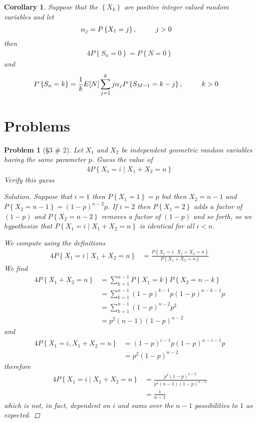 \documentclass[11pt, oneside]{book}   	%
\newtheorem{corollary}{Corollary}[chapter]
\newtheorem{problem}{Problem}[chapter]
\newcommand{\set}[1]{\left\{#1\right\}}
\begin{document}
\begin{corollary}
	Suppose that the $\set{X_k}$ are positive integer valued random variables and let 
	\begin{alignat}{4}
		\alpha_j=P\set{X_1=j},&\hspace{1 cm}j>0
	\end{alignat}
	then 
	\begin{alignat}{4}
		P\set{S_n=0}=P\set{N=0}
	\end{alignat}
	and 
	\begin{alignat}{4}
		P\set{S_n=k}=\frac{1}{k}E[N]\sum_{j=1}^k j\alpha_jP\set{S_{M-1}=k-j},&\hspace{1 cm}k>0
	\end{alignat}
\end{corollary}

\section{Problems}

\begin{problem}[\S 3 \# 2]
	Let $X_1$ and $X_2$ be independent geometric random variables having the same parameter $p$. Guess the value of 
	\begin{alignat}{4}
		P\set{X_1=i\mid X_1+X_2=n}
	\end{alignat}
	Verify this guess
	\begin{proof}[Solution]
		Suppose that $i=1$ then $P\set{X_1=1}=p$ but then $X_2=n-1$ and $P\set{X_2=n-1}=(1-p)^{n-2}p$. If $i=2$ then $P\set{X_1=2}$ adds a factor of $(1-p)$ and $P\set{X_2=n-2}$ removes a factor of $(1-p)$ and so forth, so we hypothesize that $P\set{X_1=i\mid X_1+X_2=n}$ is identical for all $i<n$.
		
		We compute using the definitions
		\begin{alignat}{4}
			P\set{X_1=i\mid X_1+X_2=n}&=\frac{P\set{X_1=i,~X_1+X_2=n}}{P\set{X_1+X_2=n}}
		\end{alignat} 
		We find
		\begin{alignat}{4}
			P\set{X_1+X_2=n}&=\sum_{k=1}^{n-1}P\set{X_1=k}P\set{X_2=n-k} \\
				&=\sum_{k=1}^{n-1}(1-p)^{k-1}p(1-p)^{n-k-1}p \\
				&=\sum_{k=1}^{n-1}(1-p)^{n-2}p^2 \\
				&=p^2(n-1)(1-p)^{n-2}
		\end{alignat}
		and
		\begin{alignat}{4}
			P\set{X_1=i, X_1+X_2=n}&=(1-p)^{i-1}p(1-p)^{n-i-1}p \\
				&=p^2(1-p)^{n-2}
		\end{alignat}
		therefore
		\begin{alignat}{4}
			P\set{X_1=i\mid X_1+X_2=n}&=\frac{p^2(1-p)^{n-2}}{p^2(n-1)(1-p)^{n-2}} \\
				&=\frac{1}{n-1}
		\end{alignat}
		which is not, in fact, dependent on $i$ and sums over the $n-1$ possibilities to $1$ as expected. 
	\end{proof}
\end{problem}
\end{document}
